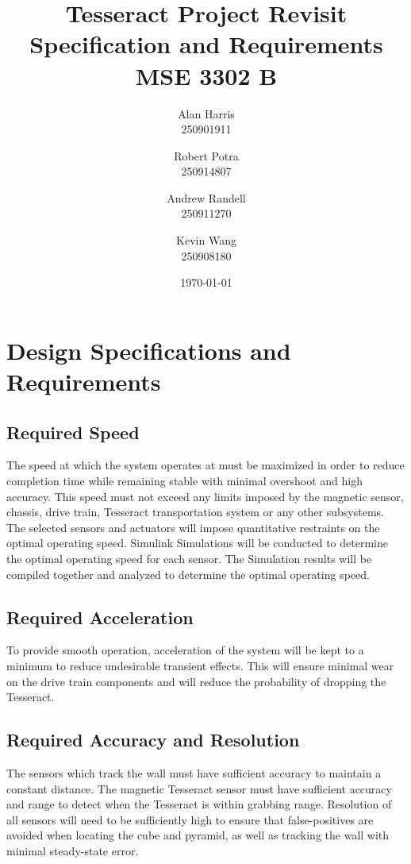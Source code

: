 \documentclass[12pt]{article}
\begin{document}
\title{\textbf{Tesseract Project Revisit\\Specification and Requirements\\ MSE 3302 B}}
\author{
  Alan Harris\\
  250901911
  \and
  Robert Potra\\
  250914807
  \and
  Andrew Randell\\
  250911270
  \and
  Kevin Wang\\
  250908180
}
\date{\today}
\maketitle

\tableofcontents
\thispagestyle{empty}

\pagebreak
\setcounter{page}{1}
 
\section{Design Specifications and Requirements}
\subsection{Required Speed}
The speed at which the system operates at must be maximized in order to reduce completion time while remaining stable with minimal overshoot and high accuracy. This speed must not exceed any limits imposed by the magnetic sensor, chassis, drive train, Tesseract transportation system or any other subsystems.  \\

The selected sensors and actuators will impose quantitative restraints on the optimal operating speed. Simulink Simulations will be conducted to determine the optimal operating speed for each sensor. The Simulation results will be compiled together and analyzed to determine the optimal operating speed.

\subsection{Required Acceleration}
To provide smooth operation, acceleration of the system will be kept to a minimum to reduce undesirable transient effects. This will ensure minimal wear on the drive train components and will reduce the probability of dropping the Tesseract. 
\subsection{Required Accuracy and Resolution}
The sensors which track the wall must have sufficient accuracy to maintain a constant distance. The magnetic Tesseract sensor must have sufficient accuracy and range to detect when the Tesseract is within grabbing range. Resolution of all sensors will need to be sufficiently high to ensure that false-positives are avoided when locating the cube and pyramid, as well as tracking the wall with minimal steady-state error.  
\end{document}
